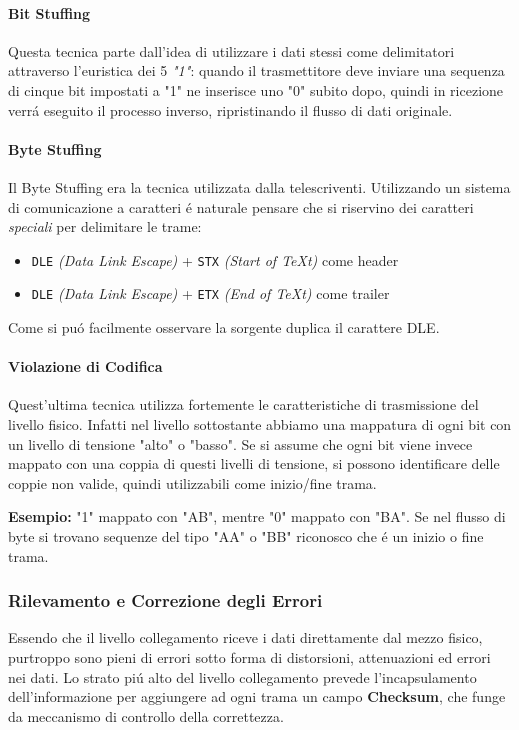\documentclass[12pt]{article}
\def\code#1{\texttt{#1}}
\begin{document}
\paragraph{Bit Stuffing} Questa tecnica parte dall'idea di utilizzare i dati stessi come delimitatori attraverso l'euristica
dei 5 \textit{"1"}: quando il trasmettitore deve inviare una sequenza di cinque bit impostati a "1" ne inserisce uno "0" 
subito dopo, quindi in ricezione verr\'a eseguito il processo inverso, ripristinando il flusso di dati originale.

\paragraph{Byte Stuffing} Il Byte Stuffing era la tecnica utilizzata dalla telescriventi. Utilizzando un sistema di 
comunicazione a caratteri \'e naturale pensare che si riservino dei caratteri \textit{speciali} per delimitare le trame:
\begin{itemize}[noitemsep]
	\item \code{DLE} \textit{(Data Link Escape)} + \code{STX} \textit{(Start of TeXt)} come header
	\item \code{DLE} \textit{(Data Link Escape)} + \code{ETX} \textit{(End of TeXt)} come trailer
\end{itemize}
Come si pu\'o facilmente osservare la sorgente duplica il carattere DLE.

\paragraph{Violazione di Codifica} Quest'ultima tecnica utilizza fortemente le caratteristiche di trasmissione del 
livello fisico. Infatti nel livello sottostante abbiamo una mappatura di ogni bit con un livello di tensione "alto" o
"basso". Se si assume che ogni bit viene invece mappato con una coppia di questi livelli di tensione, si possono 
identificare delle coppie non valide, quindi utilizzabili come inizio/fine trama.

\textbf{Esempio:} "1" mappato con "AB", mentre "0" mappato con "BA". Se nel flusso di byte si trovano sequenze del tipo "AA" 
o "BB" riconosco che \'e un inizio o fine trama.

\subsubsection{Rilevamento e Correzione degli Errori}\label{livello-collegamento-funzioni-rilevamento-errori}
Essendo che il livello collegamento riceve i dati direttamente dal mezzo fisico, purtroppo sono pieni di errori sotto forma 
di distorsioni, attenuazioni ed errori nei dati. Lo strato pi\'u alto del livello collegamento prevede l'incapsulamento 
dell'informazione per aggiungere ad ogni trama un campo \textbf{Checksum}, che funge da meccanismo di controllo della
correttezza.
\end{document}
